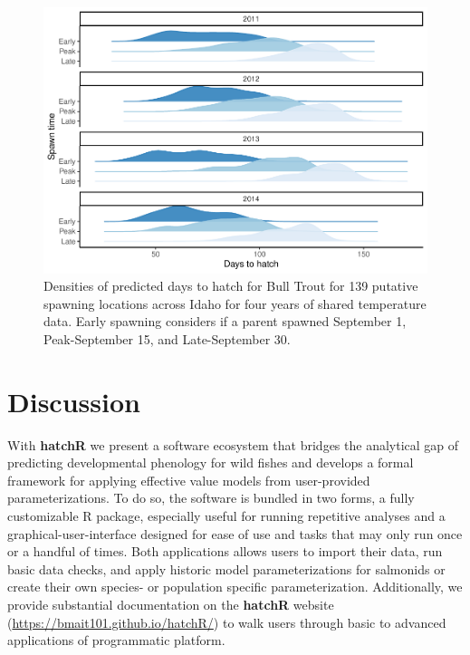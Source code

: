 \documentclass[10pt,a4paper,onecolumn]{article}
\begin{document}
\begin{figure}
\centering
\includegraphics{paper_files/figure-latex/unnamed-chunk-19-1.pdf}
\caption{Densities of predicted days to hatch for Bull Trout for 139
putative spawning locations across Idaho for four years of shared
temperature data. Early spawning considers if a parent spawned September
1, Peak-September 15, and Late-September 30.}
\end{figure}

\section{Discussion}\label{discussion}

With \textbf{hatchR} we present a software ecosystem that bridges the
analytical gap of predicting developmental phenology for wild fishes and
develops a formal framework for applying effective value models from
user-provided parameterizations. To do so, the software is bundled in
two forms, a fully customizable R package, especially useful for running
repetitive analyses and a graphical-user-interface designed for ease of
use and tasks that may only run once or a handful of times. Both
applications allows users to import their data, run basic data checks,
and apply historic model parameterizations for salmonids or create their
own species- or population specific parameterization. Additionally, we
provide substantial documentation on the \textbf{hatchR} website
(\url{https://bmait101.github.io/hatchR/}) to walk users through basic
to advanced applications of programmatic platform.
\end{document}

